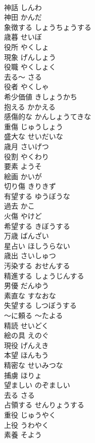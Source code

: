 \documentclass[8pt]{extreport}
\begin{document}
\begin{CJK}{UTF8}{min}
\\	神話	しんわ	
\\	神田	かんだ	
\\	象徴する	しょうちょうする	
\\	歳暮	せいぼ	
\\	役所	やくしょ	
\\	現象	げんしょう	
\\	役職	やくしょく	
\\	去る～	さる~	
\\	役者	やくしゃ	
\\	希少価値	きしょうかち	
\\	抱える	かかえる	
\\	感傷的な	かんしょうてきな	
\\	重傷	じゅうしょう	
\\	盛大な	せいだいな	
\\	歳月	さいげつ	
\\	役割	やくわり	
\\	要素	ようそ	
\\	絵画	かいが	
\\	切り傷	きりきず	
\\	有望する	ゆうぼうな	
\\	過去	かこ	
\\	火傷	やけど	
\\	希望する	きぼうする	
\\	万歳	ばんざい	
\\	星占い	ほしうらない	
\\	歳出	さいしゅつ	
\\	汚染する	おせんする	
\\	精進する	しょうじんする	
\\	男優	だんゆう	
\\	素直な	すなおな	
\\	失望する	しつぼうする	
\\	～に頼る	～たよる	
\\	精読	せいどく	
\\	絵の具	えのぐ	
\\	現役	げんえき	
\\	本望	ほんもう	
\\	精密な	せいみつな	
\\	捕虜	ほりょ	
\\	望ましい	のぞましい	
\\	去る	さる	
\\	占領する	せんりょうする	
\\	重役	じゅうやく	
\\	上役	うわやく	
\\	素養	そよう	

\end{CJK}
\end{document}
